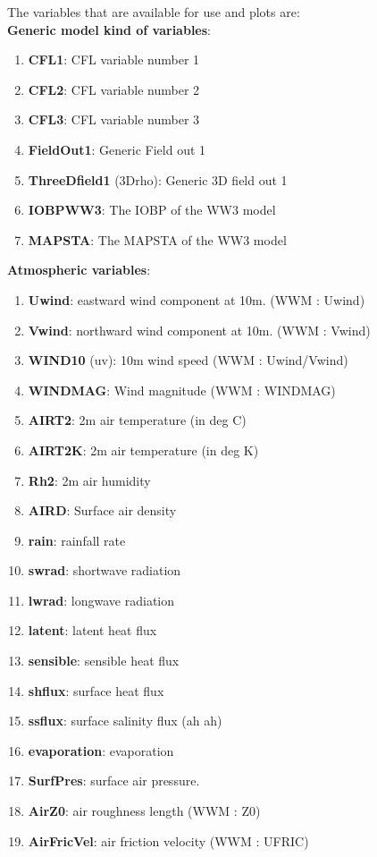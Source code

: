 \documentclass[12pt]{amsart}
\begin{document}
The variables that are available for use and plots are:\\
{\bf Generic model kind of variables}:
\begin{enumerate}
\item {\bf CFL1}: CFL variable number 1
\item {\bf CFL2}: CFL variable number 2
\item {\bf CFL3}: CFL variable number 3
\item {\bf FieldOut1}: Generic Field out 1
\item {\bf ThreeDfield1} (3Drho): Generic 3D field out 1
\item {\bf IOBPWW3}: The IOBP of the WW3 model
\item {\bf MAPSTA}: The MAPSTA of the WW3 model
\end{enumerate}
{\bf Atmospheric variables}:
\begin{enumerate}
\item {\bf Uwind}: eastward wind component at 10m. (WWM : Uwind)
\item {\bf Vwind}: northward wind component at 10m. (WWM : Vwind)
\item {\bf WIND10} (uv): 10m wind speed (WWM : Uwind/Vwind)
\item {\bf WINDMAG}: Wind magnitude (WWM : WINDMAG)
\item {\bf AIRT2}: 2m air temperature (in deg C)
\item {\bf AIRT2K}: 2m air temperature (in deg K)
\item {\bf Rh2}: 2m air humidity
\item {\bf AIRD}: Surface air density
\item {\bf rain}: rainfall rate
\item {\bf swrad}: shortwave radiation
\item {\bf lwrad}: longwave radiation
\item {\bf latent}: latent heat flux
\item {\bf sensible}: sensible heat flux
\item {\bf shflux}: surface heat flux
\item {\bf ssflux}: surface salinity flux (ah ah)
\item {\bf evaporation}: evaporation
\item {\bf SurfPres}: surface air pressure.
\item {\bf AirZ0}: air roughness length (WWM : Z0)
\item {\bf AirFricVel}: air friction velocity (WWM : UFRIC)
\end{enumerate}
\end{document}
